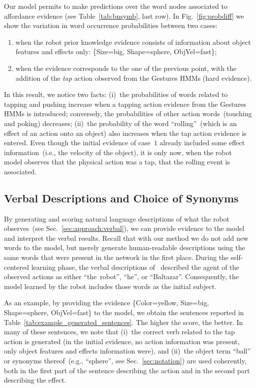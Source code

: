 Our model permits to make predictions over the word nodes associated to affordance evidence (see Table~\ref{tab:bnsymb}, last row).
In Fig.~\ref{fig:probdiff} we show the variation in word occurrence probabilities between two cases:
\begin{enumerate}
\item when the robot prior knowledge evidence consists of information about object features and effects only: \{Size=big, Shape=sphere, ObjVel=fast\};

\item when the evidence corresponds to the one of the previous point, with the addition of the \emph{tap} action observed from the Gestures \acp{HMM} (hard evidence).
\end{enumerate}

In this result, we notice two facts: (i)~the probabilities of words related to tapping and pushing increase when a tapping action evidence from the Gestures \acp{HMM} is introduced; conversely, the probabilities of other action words~(touching and poking) decreases; (ii)~the probability of the word ``rolling''~(which is an effect of an action onto an object) also increases when the tap action evidence is entered. Even though the initial evidence of case~$1$ already included some effect information~(i.e., the velocity of the object), it is only now, when the robot model observes that the physical action was a tap, that the rolling event is associated.

\subsection{Verbal Descriptions and Choice of Synonyms}
\label{sec:results:verbal_descriptions}

By generating and scoring natural language descriptions of what the robot observes~(see Sec.~\ref{sec:approach:verbal}), we can provide evidence to the model and interpret the verbal results.
Recall that with our method we do not add new words to the model, but merely generate human-readable descriptions using the same words that were present in the \AffWords{} network in the first place.
During the self-centered learning phase, the verbal descriptions of~\cite{salvi:2012:smcb} described the agent of the observed actions as either ``the~robot'', ``he'', or ``Baltazar''.
Consequently, the \AffWords{} model learned by the robot includes those words as the initial subject.

As an example, by providing the evidence \{Color=yellow, Size=big, Shape=sphere, ObjVel=fast\} to the model, we obtain the sentences reported in Table~\ref{tab:example_generated_sentences}.
The higher the score, the better.
In many of these sentences, we note that (i)~the correct verb related to the tap action is generated (in the initial evidence, no action information was present, only object features and effects information were), and (ii)~the object term ``ball'' or synonyms thereof~(e.g., ``sphere'', see Sec.~\ref{sec:notation}) are used coherently, both in the first part of the sentence describing the action and in the second part describing the effect.

